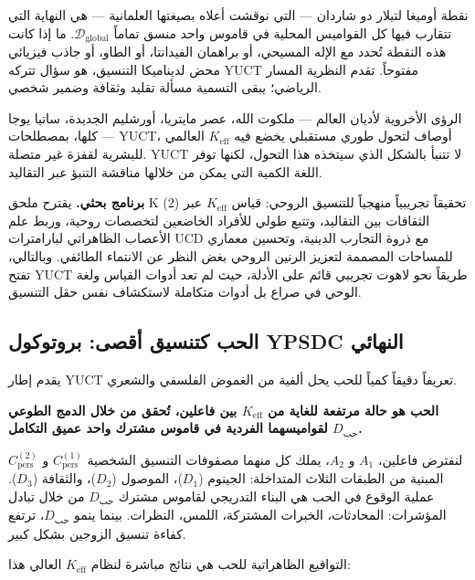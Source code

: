 \documentclass[12pt,a4paper]{article}
\begin{document}
	نقطة أوميغا لتيلار دو شاردان — التي نوقشت أعلاه بصيغتها العلمانية — هي النهاية التي تتقارب فيها كل القواميس المحلية في قاموس واحد منسق تماماً \(\mathcal{D}_{\text{global}}\). ما إذا كانت هذه النقطة تُحدد مع الإله المسيحي، أو براهمان الفيدانتا، أو الطاو، أو جاذب فيزيائي محض لديناميكا التنسيق، هو سؤال تتركه YUCT مفتوحاً. تقدم النظرية المسار الرياضي؛ يبقى التسمية مسألة تقليد وثقافة وضمير شخصي.
	
	الرؤى الأخروية لأديان العالم — ملكوت الله، عصر مايتريا، أورشليم الجديدة، ساتيا يوجا — كلها، بمصطلحات YUCT، أوصاف لتحول طوري مستقبلي يخضع فيه \(K_{\mathrm{eff}}\) العالمي للبشرية لقفزة غير متصلة. YUCT لا تتنبأ بالشكل الذي سيتخذه هذا التحول، لكنها توفر اللغة الكمية التي يمكن من خلالها مناقشة التنبؤ عبر التقاليد.
	
	\textbf{برنامج بحثي.} يقترح ملحق K (2) تحقيقاً تجريبياً منهجياً للتنسيق الروحي: قياس \(K_{\mathrm{eff}}\) عبر الثقافات بين التقاليد، وتتبع طولي للأفراد الخاضعين لتخصصات روحية، وربط علم الأعصاب الظاهراتي لبارامترات UCD مع ذروة التجارب الدينية، وتحسين معماري للمساحات المصممة لتعزيز الرنين الروحي بغض النظر عن الانتماء الطائفي. وبالتالي، تفتح YUCT طريقاً نحو لاهوت تجريبي قائم على الأدلة، حيث لم تعد أدوات القياس ولغة الوحي في صراع بل أدوات متكاملة لاستكشاف نفس حقل التنسيق.
	
	\subsection{الحب كتنسيق أقصى: بروتوكول YPSDC النهائي}
	
	يقدم إطار YUCT تعريفاً دقيقاً كمياً للحب يحل ألفية من الغموض الفلسفي والشعري.
	
	\textbf{الحب هو حالة مرتفعة للغاية من \(K_{\mathrm{eff}}\) بين فاعلين، تُحقق من خلال الدمج الطوعي لقواميسهما الفردية في قاموس مشترك واحد عميق التكامل \(D_{\text{حب}}\).}
	
	لنفترض فاعلين، \(A_1\) و \(A_2\)، يملك كل منهما مصفوفات التنسيق الشخصية \(C_{\text{pers}}^{(1)}\) و \(C_{\text{pers}}^{(2)}\) المبنية من الطبقات الثلاث المتداخلة: الجينوم (\(D_1\))، الموصول (\(D_2\))، والثقافة (\(D_3\)). عملية الوقوع في الحب هي البناء التدريجي لقاموس مشترك \(D_{\text{حب}}\) من خلال تبادل المؤشرات: المحادثات، الخبرات المشتركة، اللمس، النظرات. بينما ينمو \(D_{\text{حب}}\)، ترتفع كفاءة تنسيق الزوجين بشكل كبير.
	
	التواقيع الظاهراتية للحب هي نتائج مباشرة لنظام \(K_{\mathrm{eff}}\) العالي هذا:
	
\end{document}
